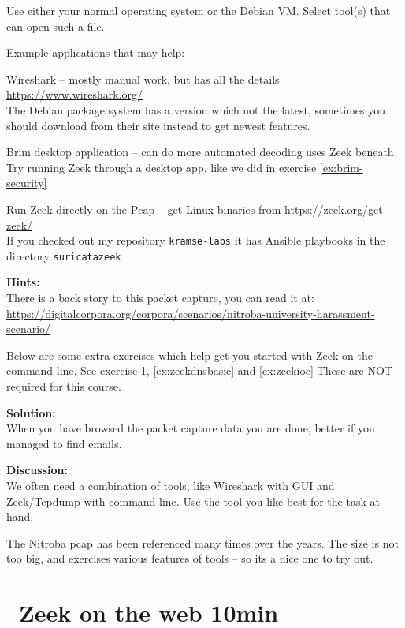 \documentclass[a4paper,11pt,notitlepage]{report}
\begin{document}
Use either your normal operating system or the Debian VM. Select tool(s) that can open such a file.


Example applications that may help:
\begin{list2}
\item Wireshark -- mostly manual work, but has all the details
\url{https://www.wireshark.org/}\\
The Debian package system has a version which not the latest, sometimes you should download from their site instead to get newest features.
\item Brim desktop application -- can do more automated decoding uses Zeek beneath\\
Try running Zeek through a desktop app, like we did in exercise \ref{ex:brim-security}
\item Run Zeek directly on the Pcap -- get Linux binaries from \url{https://zeek.org/get-zeek/}\\
If you checked out my repository \verb+kramse-labs+ it has Ansible playbooks in the directory \verb+suricatazeek+
\end{list2}


{\bf Hints:}\\
There is a back story to this packet capture, you can read it at:\\
\url{https://digitalcorpora.org/corpora/scenarios/nitroba-university-harassment-scenario/}


Below are some extra exercises which help get you started with Zeek on the command line.
See exercise \ref{ex:zeekweb}, \ref{ex:zeekdnsbasic} and \ref{ex:zeekioc} These are NOT required for this course.

{\bf Solution:}\\
When you have browsed the packet capture data you are done, better if you managed to find emails.

{\bf Discussion:}\\
We often need a combination of tools, like Wireshark with GUI and Zeek/Tcpdump with command line. Use the tool you like best for the task at hand.

The Nitroba pcap has been referenced many times over the years. The size is not too big, and exercises various features of tools -- so its a nice one to try out.




\chapter{\faInfoCircle\ Zeek on the web 10min}
\label{ex:zeekweb}
\end{document}

